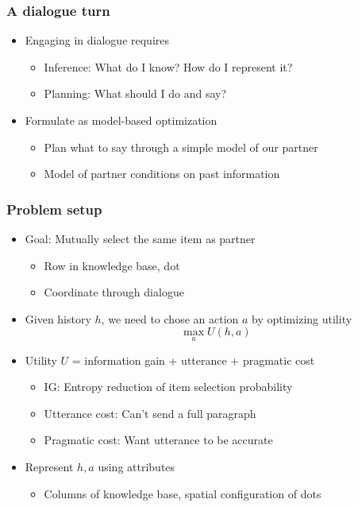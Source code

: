 \documentclass{beamer}
\begin{document}
\begin{frame}
\frametitle{A dialogue turn}
\begin{itemize}
\item Engaging in dialogue requires
    \begin{itemize}
    \item Inference: What do I know? How do I represent it?
    \item Planning: What should I do and say?
    \end{itemize}
\item Formulate as model-based optimization
    \begin{itemize}
    \item Plan what to say through a simple model of our partner
    \item Model of partner conditions on past information
    \end{itemize}
\end{itemize}
\end{frame}

\begin{frame}
\frametitle{Problem setup}
\begin{itemize}
\item Goal: Mutually select the same item as partner
    \begin{itemize}
    \item Row in knowledge base, dot
    \item Coordinate through dialogue
    \end{itemize}
\item Given history $h$,
we need to chose an action $a$ by optimizing utility
\begin{equation*}
\max_a U(h, a)
\end{equation*}
\item Utility $U$ = information gain + utterance + pragmatic cost
    \begin{itemize}
    \item IG: Entropy reduction of item selection probability
    \item Utterance cost: Can't send a full paragraph
    \item Pragmatic cost: Want utterance to be accurate
    \end{itemize}
\item Represent $h,a$ using attributes
    \begin{itemize}
    \item Columns of knowledge base, spatial configuration of dots
    \end{itemize}
\end{itemize}
\end{frame}
\end{document}
